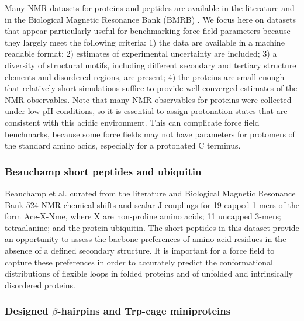 \documentclass[9pt,review]{livecoms}
\begin{document}
Many NMR datasets for proteins and peptides are available in the literature and in the Biological Magnetic Resonance Bank (BMRB) \cite{ulrich_biomagresbank_2008,romero_biomagresbank_2020}.
We focus here on datasets that appear particularly useful for benchmarking force field parameters because they largely meet the following criteria: 1) the data are available in a machine readable format; 2) estimates of experimental uncertainty are included; 3) a diversity of structural motifs, including different secondary and tertiary structure elements and disordered regions, are present; 4) the proteins are small enough that relatively short simulations suffice to provide well-converged estimates of the NMR observables.
Note that many NMR observables for proteins were collected under low pH conditions, so it is essential to assign protonation states that are consistent with this acidic environment.
This can complicate force field benchmarks, because some force fields may not have parameters for protomers of the standard amino acids, especially for a protonated C terminus.

\subsubsection{Beauchamp short peptides and ubiquitin}
\label{sub2:beauchamp}

Beauchamp et al. \cite{beauchamp_are_2012} curated from the literature and Biological Magnetic Resonance Bank 524 NMR chemical shifts and scalar J-couplings for 19 capped 1-mers of the form Ace-X-Nme, where X are non-proline amino acids; 11 uncapped 3-mers; tetraalanine; and the protein ubiquitin.
The short peptides in this dataset provide an opportunity to assess the bacbone preferences of amino acid residues in the absence of a defined secondary structure.
It is important for a force field to capture these preferences in order to accurately predict the conformational distributions of flexible loops in folded proteins and of unfolded and intrinsically disordered proteins.

\subsubsection{Designed $\beta$-hairpins and Trp-cage miniproteins}
\label{sub2:designed_beta}
\end{document}
